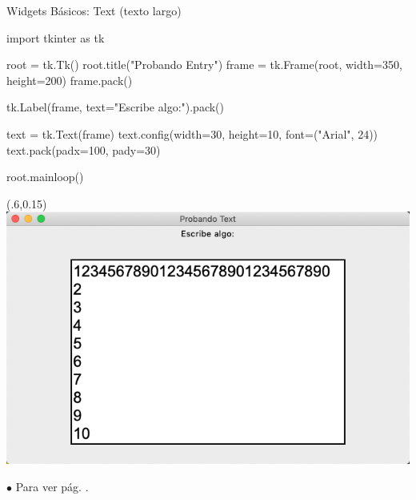 \documentclass[10pt, envcountsect , spanish]{beamer}
\begin{document}
\begin{frame}[fragile]{Widgets Básicos: Text  (texto largo)}
{}

\begin{pyverbatim}[][frame=single]
import tkinter as tk

root = tk.Tk()
root.title("Probando Entry")
frame = tk.Frame(root, 
             width=350, 
             height=200)
frame.pack()


tk.Label(frame, text="Escribe algo:").pack()

text = tk.Text(frame)
text.config(width=30, height=10, font=("Arial", 24))
text.pack(padx=100, pady=30)

root.mainloop()
\end{pyverbatim}

\begin{textblock*}{.5\textwidth}(.6\textwidth,0.15\textheight)
\includegraphics[width=\textwidth]{fig/text}
\end{textblock*}

{\scriptsize $\bullet$
Para  ver pág. \pageref{pack}.
}
\end{frame}
\end{document}
